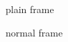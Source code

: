 \documentclass{beamer}
\begin{document}
    \begin{frame}[plain]
        plain frame
    \end{frame}

    \begin{frame}
        normal frame
    \end{frame}
\end{document}
